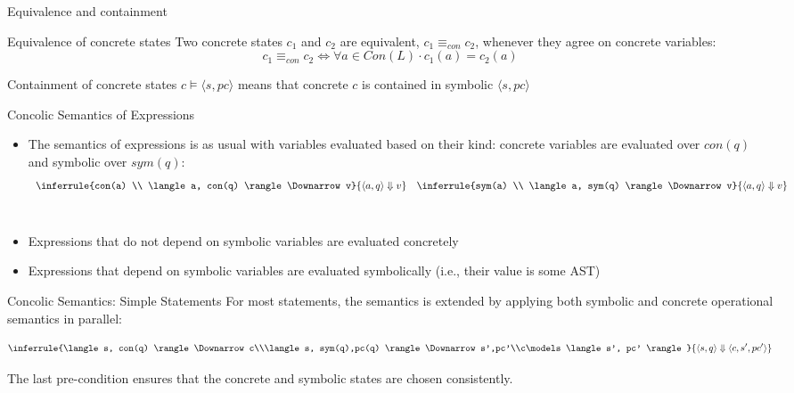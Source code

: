 \documentclass[t]{beamer}
\newcommand{\sem}[3]{\langle #1, #2 \rangle \Downarrow #3}
\newcommand{\cequiv}{\equiv_{con}}
\begin{document}
\begin{frame}{Equivalence and containment}
  \begin{block}{Equivalence of concrete states}
    Two concrete states $c_1$ and $c_2$ are equivalent,
    $c_1 \cequiv c_2$, whenever they agree on concrete variables:
    \[
      c_1 \cequiv c_2 \iff \forall a \in Con(L) \cdot c_1(a) = c_2(a)
    \]
  \end{block}
  \vfill
  \begin{block}{Containment of concrete states}
    $c \models \langle s, pc \rangle$ means that concrete
    $c$ is contained in symbolic $\langle s, pc \rangle$
  \end{block}
\end{frame}

\begin{frame}{Concolic Semantics of Expressions}
  \begin{itemize}
  \item The semantics of expressions is as usual with variables
    evaluated based on their kind: concrete variables are evaluated
    over $con(q)$ and symbolic over $sym(q)$:
\[
\begin{array}{ll}
\inferrule{con(a) \\ \sem{a}{con(q)}{v}}{\sem{a}{q}{v}}&
\inferrule{sym(a) \\ \sem{a}{sym(q)}{v}}{\sem{a}{q}{v}}
\end{array}
\]
\\\vfill

\item Expressions that do not depend on symbolic variables are
  evaluated concretely
\\\vfill

\item Expressions that depend on symbolic variables are evaluated
  symbolically (i.e., their value is some AST)
\end{itemize}
\end{frame}

\begin{frame}{Concolic Semantics: Simple Statements}
For most statements, the semantics is extended by applying both
symbolic and concrete operational semantics in parallel:

\vspace{0.3in}
\[
  \inferrule{\sem{s}{con(q)}{c}\\\sem{s}{sym(q),pc(q)}{s',pc'}\\c\models\langle
  s', pc' \rangle}%
  {\sem{s}{q}{\langle c, s', pc' \rangle} }
\]
\vspace{0.3in}

The last pre-condition ensures that the concrete and symbolic states
are chosen consistently.
\end{frame}
\end{document}
